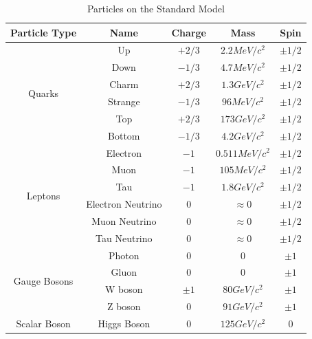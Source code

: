 \begin{table}
\caption{Particles on the Standard Model}
\label{tab:particles}
\begin{center}
\begin{tabular}{|c|c|c|c|c|}
\hline
Particle Type & Name & Charge & Mass & Spin \\
\hline
\multirow{6}{2em}{Quarks} & Up & $+2/3$ & $2.2 MeV/c^2$ & $\pm 1/2$ \\
& Down & $-1/3$ & $4.7 MeV/c^2$ & $\pm 1/2$ \\
& Charm & $+2/3$ & $1.3 GeV/c^2$ & $\pm 1/2$ \\
& Strange & $-1/3$ & $96 MeV/c^2$ & $\pm 1/2$ \\
& Top & $+2/3$ & $173 GeV/c^2$ & $\pm 1/2$ \\
& Bottom & $-1/3$ & $4.2 GeV/c^2$ & $\pm 1/2$ \\
\hline
\multirow{6}{2em}{Leptons} & Electron & $-1$ & $0.511 MeV/c^2$ & $\pm 1/2$ \\
& Muon & $-1$ & $105 MeV/c^2$ & $\pm 1/2$ \\
& Tau & $-1$ & $1.8 GeV/c^2$ & $\pm 1/2$ \\
& Electron Neutrino & $0$ & $\approx 0$ & $\pm 1/2$ \\
& Muon Neutrino & $0$ & $\approx 0$ & $\pm 1/2$ \\
& Tau Neutrino & $0$ & $\approx 0$ & $\pm 1/2$ \\
\hline
\multirow{4}{2em}{Gauge Bosons} & Photon & 0 & 0 & $\pm 1$ \\
& Gluon & 0 & 0 & $\pm 1$ \\
& W boson & $\pm 1$ & $80 GeV/c^2$ & $\pm 1$ \\
& Z boson & 0 & $91 GeV/c^2$ & $\pm 1$ \\
\hline
Scalar Boson & Higgs Boson & 0 & $125 GeV/c^2$ & 0 \\
\hline
\end{tabular}
\end{center}
\end{table} 

